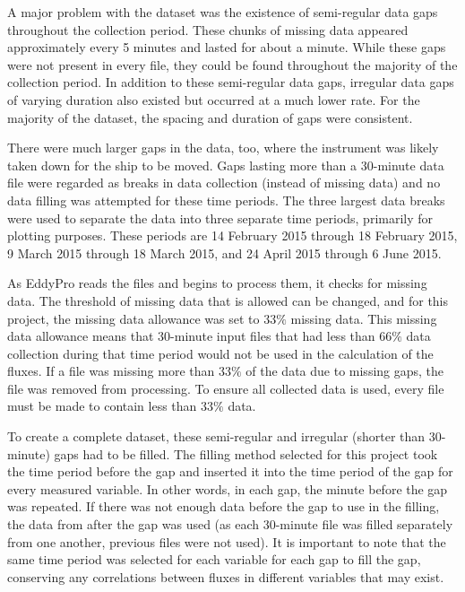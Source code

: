 A major problem with the dataset was the existence of semi-regular data gaps throughout the collection period. These chunks of missing data appeared approximately every 5 minutes and lasted for about a minute. While these gaps were not present in every file, they could be found throughout the majority of the collection period. In addition to these semi-regular data gaps, irregular data gaps of varying duration also existed but occurred at a much lower rate. For the majority of the dataset, the spacing and duration of gaps were consistent.

There were much larger gaps in the data, too, where the instrument was likely taken down for the ship to be moved. Gaps lasting more than a 30-minute data file were regarded as breaks in data collection (instead of missing data) and no data filling was attempted for these time periods. The three largest data breaks were used to separate the data into three separate time periods, primarily for plotting purposes. These periods are 14 February 2015 through 18 February 2015, 9 March 2015 through 18 March 2015, and 24 April 2015 through 6 June 2015.  

As EddyPro reads the files and begins to process them, it checks for missing data. The threshold of missing data that is allowed can be changed, and for this project, the missing data allowance was set to 33$\%$ missing data. This missing data allowance means that 30-minute input files that had less than 66$\%$ data collection during that time period would not be used in the calculation of the fluxes. If a file was missing more than 33$\%$ of the data due to missing gaps, the file was removed from processing. To ensure all collected data is used, every file must be made to contain less than 33$\%$ data. 
 
 To create a complete dataset, these semi-regular and irregular (shorter than 30-minute) gaps had to be filled. The filling method selected for this project took the time period before the gap and inserted it into the time period of the gap for every measured variable. In other words, in each gap, the minute before the gap was repeated. If there was not enough data before the gap to use in the filling, the data from after the gap was used (as each 30-minute file was filled separately from one another, previous files were not used). It is important to note that the same time period was selected for each variable for each gap to fill the gap, conserving any correlations between fluxes in different variables that may exist.  

